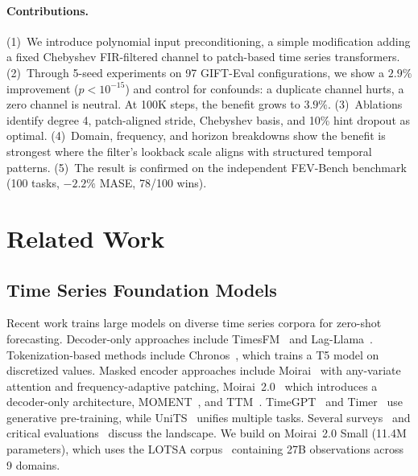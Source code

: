 \documentclass{article}
\begin{document}
\paragraph{Contributions.}
(1)~We introduce polynomial input preconditioning, a simple modification adding a fixed Chebyshev FIR-filtered channel to patch-based time series transformers.
(2)~Through 5-seed experiments on 97 GIFT-Eval configurations, we show a $2.9\%$ improvement ($p < 10^{-15}$) and control for confounds: a duplicate channel hurts, a zero channel is neutral. At 100K steps, the benefit grows to $3.9\%$.
(3)~Ablations identify degree 4, patch-aligned stride, Chebyshev basis, and 10\% hint dropout as optimal.
(4)~Domain, frequency, and horizon breakdowns show the benefit is strongest where the filter's lookback scale aligns with structured temporal patterns.
(5)~The result is confirmed on the independent FEV-Bench benchmark (100 tasks, $-2.2\%$ MASE, 78/100 wins).

\section{Related Work}
\label{sec:related}

\subsection{Time Series Foundation Models}

Recent work trains large models on diverse time series corpora for zero-shot forecasting. Decoder-only approaches include TimesFM~\citep{das2024decoder} and Lag-Llama~\citep{rasul2024lagllama}. Tokenization-based methods include Chronos~\citep{ansari2024chronos}, which trains a T5 model on discretized values. Masked encoder approaches include Moirai~\citep{woo2024unified} with any-variate attention and frequency-adaptive patching, Moirai~2.0~\citep{liu2024moirai2} which introduces a decoder-only architecture, MOMENT~\citep{goswami2024moment}, and TTM~\citep{ekambaram2024ttm}. TimeGPT~\citep{garza2024timegpt} and Timer~\citep{liu2024timer} use generative pre-training, while UniTS~\citep{gao2024units} unifies multiple tasks. Several surveys~\citep{liang2024foundation,yuqi2024survey} and critical evaluations~\citep{zhang2025tsfmready} discuss the landscape. We build on Moirai~2.0 Small (11.4M parameters), which uses the LOTSA corpus~\citep{woo2024unified} containing 27B observations across 9 domains.
\end{document}
